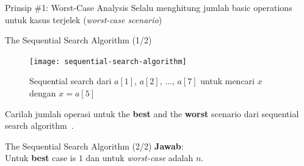 \documentclass[pdf]{beamer}
\theoremstyle{mystyle}
\let\emph\relax %
\begin{document}
\begin{frame}{Prinsip \#1: Worst-Case Analysis}
	Selalu menghitung jumlah basic operations untuk kasus terjelek (\textit{worst-case scenario})
\end{frame}

\begin{frame}{The Sequential Search Algorithm (1/2)}
	\begin{figure}[!ht]
		\centering
		\texttt{[image: sequential-search-algorithm]}
		\caption{Sequential search dari $a[1]$, $a[2]$, $\ldots$, $a[7]$ untuk mencari $x$ dengan $x = a[5]$}
		\label{fig:sequential-search-epps}
	\end{figure}
	Carilah jumlah operasi untuk the \textbf{best} and the \textbf{worst} scenario dari sequential search algorithm~\citep{epp2010discrete}.
\end{frame}

\begin{frame}{The Sequential Search Algorithm (2/2)}
	\textbf{Jawab}:\\
	Untuk \textbf{best} case is $1$ dan untuk \textit{worst-case} adalah $n$.		
\end{frame}

%    
%
%	
%	
%
\end{document}
